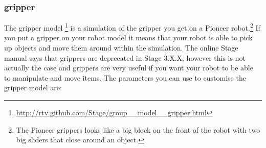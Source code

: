 \documentclass[a4paper]{report}
\begin{document}
\subsubsection{gripper} \label{sec:BuildingAWorld:BuildingRobot:RobotSensors:Gripper}
The gripper model \footnote{\url{http://rtv.github.com/Stage/group__model__gripper.html}}
is a simulation of the gripper you get on a Pioneer robot.\footnote{The Pioneer grippers looks like a big block on the front of the robot with two big sliders that close around an object.} If you put a gripper on your robot model it means that your robot is able to pick up objects and move them around within the simulation. 
The online Stage manual says that grippers are deprecated in Stage 3.X.X, however this is not actually the case and grippers are very useful if you want your robot to be able to manipulate and move items. The parameters you can use to customise the gripper model are:
\end{document}
